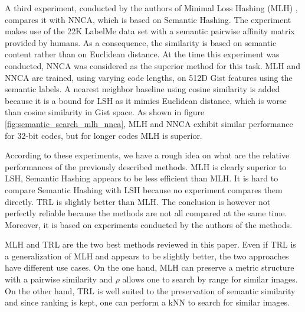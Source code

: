 A third experiment, conducted by the authors of Minimal Loss Hashing (MLH) \cite{norouzi2011minimal}, compares it with NNCA, which is based on Semantic Hashing. The experiment makes use of the 22K LabelMe data set with a semantic pairwise affinity matrix provided by humans. As a consequence, the similarity is based on semantic content rather than on Euclidean distance. At the time this experiment was conducted, NNCA was considered as the superior method for this task. MLH and NNCA are trained, using varying code lengths, on 512D Gist features using the semantic labels. A nearest neighbor baseline using cosine similarity is added because it is a bound for LSH as it mimics Euclidean distance, which is worse than cosine similarity in Gist space. As shown in figure \ref{fig:semantic_search_mlh_nnca}, MLH and NNCA exhibit similar performance for 32-bit codes, but for longer codes MLH is superior.

According to these experiments, we have a rough idea on what are the relative performances of the previously described methods. MLH is clearly superior to LSH, Semantic Hashing appears to be less efficient than MLH. It is hard to compare Semantic Hashing with LSH because no experiment compares them directly. TRL is slightly better than MLH. The conclusion is however not perfectly reliable because the methods are not all compared at the same time. Moreover, it is based on experiments conducted by the authors of the methods.

MLH and TRL are the two best methods reviewed in this paper. Even if TRL is a generalization of MLH and appears to be slightly better, the two approaches have different use cases. On the one hand, MLH can preserve a metric structure with a pairwise similarity and $\rho$ allows one to search by range for similar images. On the other hand, TRL is well suited to the preservation of semantic similarity and since ranking is kept, one can perform a kNN to search for similar images.